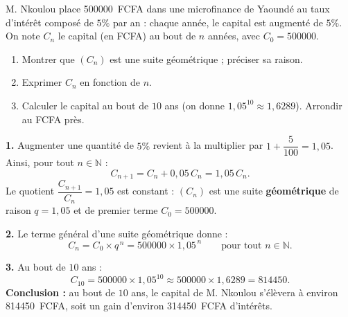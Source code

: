\documentclass[11pt]{article}
\begin{document}
\begin{exoresolu}
M. Nkoulou place \SI{500000}{FCFA} dans une microfinance de Yaoundé au taux d'intérêt composé de $5\%$ par an : chaque année, le capital est augmenté de $5\%$. On note $C_n$ le capital (en FCFA) au bout de $n$ années, avec $C_0=500000$.
\begin{enumerate}
\item Montrer que $(C_n)$ est une suite géométrique ; préciser sa raison.
\item Exprimer $C_n$ en fonction de $n$.
\item Calculer le capital au bout de $10$ ans (on donne $1,05^{10}\approx 1,6289$). Arrondir au FCFA près.
\end{enumerate}
\tcblower
\textbf{1.} Augmenter une quantité de $5\%$ revient à la multiplier par $1+\dfrac{5}{100}=1,05$. Ainsi, pour tout $n\in\mathbb{N}$ :
\[ C_{n+1}=C_n+0,05\,C_n=1,05\,C_n. \]
Le quotient $\dfrac{C_{n+1}}{C_n}=1,05$ est constant : $(C_n)$ est une suite \textbf{géométrique} de raison $q=1,05$ et de premier terme $C_0=500000$.

\textbf{2.} Le terme général d'une suite géométrique donne :
\[ C_n=C_0\times q^{\,n}=500000\times 1,05^{\,n} \qquad\text{pour tout } n\in\mathbb{N}. \]

\textbf{3.} Au bout de $10$ ans :
\[ C_{10}=500000\times 1,05^{10}\approx 500000\times 1,6289 = 814450. \]
\textbf{Conclusion :} au bout de $10$ ans, le capital de M. Nkoulou s'élèvera à environ \SI{814450}{FCFA}, soit un gain d'environ \SI{314450}{FCFA} d'intérêts.
\end{exoresolu}
\end{document}
